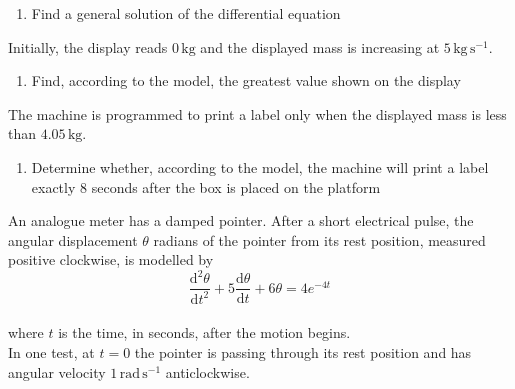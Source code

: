 \documentclass[leqno]{article}
\begin{document}
\begin{enumerate}[
  label=\textbf{\arabic*.},
  leftmargin=*,
  topsep=0pt,
  partopsep=0pt,
  parsep=0pt
]
\begin{enumerate}[label=\textbf{(\alph*)}]
  \item Find a general solution of the differential equation  \\
\end{enumerate}
Initially, the display reads $0\,\mathrm{kg}$ and the displayed mass is increasing at $5\,\mathrm{kg\,s^{-1}}$. \\
\begin{enumerate}[label=\textbf{(\alph*)}, resume]
  \item Find, according to the model, the greatest value shown on the display  \\
\end{enumerate}
The machine is programmed to print a label only when the displayed mass is less than $4.05\,\mathrm{kg}$. \\
\begin{enumerate}[label=\textbf{(\alph*)}, resume]
  \item Determine whether, according to the model, the machine will print a label exactly $8$ seconds after the box is placed on the platform  \\
\end{enumerate}

\newpage

\questionitem

An analogue meter has a damped pointer. After a short electrical pulse, the angular displacement $\theta$ radians of the pointer from its rest position, measured positive clockwise, is modelled by \\
\[\frac{\mathrm{d}^2 \theta}{\mathrm{d} t^2}+5\frac{\mathrm{d} \theta}{\mathrm{d} t}+6\theta=4e^{-4t}\] \\
where $t$ is the time, in seconds, after the motion begins. \\

In one test, at $t=0$ the pointer is passing through its rest position and has angular velocity $1\,\mathrm{rad\,s^{-1}}$ anticlockwise. \\


\end{enumerate}
\end{document}
